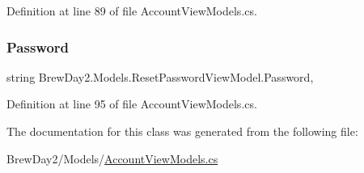 Definition at line 89 of file Account\+View\+Models.\+cs.

\mbox{\label{class_brew_day2_1_1_models_1_1_reset_password_view_model_a6320cc02c8c3f7ee2aba95eb514187a9}} 
\subsubsection{\texorpdfstring{Password}{Password}}
{\footnotesize\ttfamily string Brew\+Day2.\+Models.\+Reset\+Password\+View\+Model.\+Password\hspace{0.3cm}{\ttfamily [get]}, {\ttfamily [set]}}



Definition at line 95 of file Account\+View\+Models.\+cs.



The documentation for this class was generated from the following file\+:\begin{DoxyCompactItemize}
\item 
Brew\+Day2/\+Models/\mbox{\hyperlink{_account_view_models_8cs}{Account\+View\+Models.\+cs}}\end{DoxyCompactItemize}
